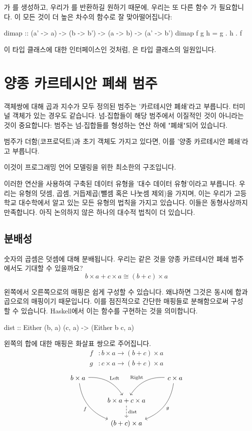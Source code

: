 \documentclass[DaoFP]{subfiles}
\begin{document}
\begin{CJK*}{UTF8}{gbsn}
가 를 생성하고, 우리가 를 반환하길 원하기 때문에, 우리는 또 다른 함수 가 필요합니다. 이 모든 것이 더 높은 차수의 함수로 잘 맞아떨어집니다:
\begin{haskell}
dimap :: (a' -> a) -> (b -> b') -> (a -> b) -> (a' -> b')
dimap f g h = g . h . f
\end{haskell}
이  타입 클래스에 대한 인터페이스인 것처럼, 은  타입 클래스의 일원입니다.

\section{양종 카르테시안 폐쇄 범주}

객체쌍에 대해 곱과 지수가 모두 정의된 범주는 '카르테시안 폐쇄'라고 부릅니다. 터미널 객체가 있는 경우도 같습니다. 넘-집합들이 해당 범주에서 이질적인 것이 아니라는 것이 중요합니다: 범주는 넘-집합들를 형성하는 연산 하에 "폐쇄"되어 있습니다.

범주가 더함(코프로덕트)과 초기 객체도 가지고 있다면, 이를 '양종 카르테시안 폐쇄'라고 부릅니다.

이것이 프로그래밍 언어 모델링을 위한 최소한의 구조입니다.

이러한 연산을 사용하여 구축된 데이터 유형을 '대수 데이터 유형'이라고 부릅니다. 우리는 유형의 덧셈, 곱셈, 거듭제곱(뺄셈 혹은 나눗셈 제외)을 가지며, 이는 우리가 고등학교 대수학에서 알고 있는 모든 유형의 법칙을 가지고 있습니다. 이들은 동형사상까지 만족합니다. 아직 논의하지 않은 하나의 대수적 법칙이 더 있습니다.

\subsection{분배성}

숫자의 곱셈은 덧셈에 대해 분배됩니다. 우리는 같은 것을 양종 카르테시안 폐쇄 범주에서도 기대할 수 있을까요?
\[b \times a + c \times a \cong (b + c) \times a\]

왼쪽에서 오른쪽으로의 매핑은 쉽게 구성할 수 있습니다. 왜냐하면 그것은 동시에 합과 곱으로의 매핑이기 때문입니다. 이를 점진적으로 간단한 매핑들로 분해함으로써 구성할 수 있습니다. Haskell에서 이는 함수를 구현하는 것을 의미합니다.
\begin{haskell}
dist :: Either (b, a) (c, a) -> (Either b c, a)
\end{haskell}
왼쪽의 합에 대한 매핑은 화살표 쌍으로 주어집니다.
\begin{align*}
f &\colon b\times a \to (b + c) \times a \\
g &\colon c\times a \to (b + c) \times a 
\end{align*}
\[
 \begin{tikzcd}
 b \times a
 \arrow[dr,  bend left, "\text{Left}"]
 \arrow[ddr, bend right, "f"']
 && c \times a
 \arrow[dl, bend right, "\text{Right}"']
 \arrow[ddl, bend left, "g"]
 \\
& b \times a + c \times a
\arrow[d, dashed, "\text{dist}"]
\\
& (b + c) \times a
 \end{tikzcd}
\]


\end{CJK*}
\end{document}
